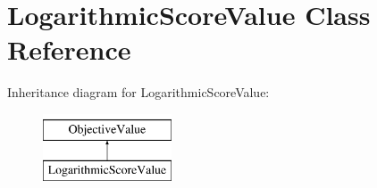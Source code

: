 \hypertarget{classLogarithmicScoreValue}{\section{Logarithmic\-Score\-Value Class Reference}
\label{classLogarithmicScoreValue}
}
Inheritance diagram for Logarithmic\-Score\-Value\-:\begin{figure}[H]
\begin{center}
\leavevmode
\includegraphics[height=2.000000cm]{classLogarithmicScoreValue}
\end{center}
\end{figure}
